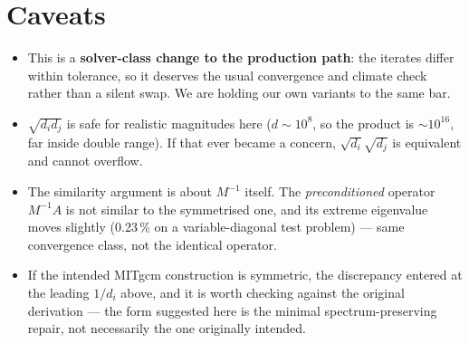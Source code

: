 \documentclass[11pt,a4paper]{article}
\newcommand{\Mi}{M^{-1}}
\begin{document}
\section{Caveats}

\begin{itemize}
  \item This is a \textbf{solver-class change to the production path}: the iterates differ
        within tolerance, so it deserves the usual convergence and climate check rather than a
        silent swap. We are holding our own variants to the same bar.
  \item $\sqrt{d_i d_j}$ is safe for realistic magnitudes here ($d\sim10^8$, so the product is
        $\sim10^{16}$, far inside double range). If that ever became a concern,
        $\sqrt{d_i}\sqrt{d_j}$ is equivalent and cannot overflow.
  \item The similarity argument is about $\Mi$ itself. The \emph{preconditioned} operator
        $\Mi A$ is not similar to the symmetrised one, and its extreme eigenvalue moves
        slightly (0.23\,\% on a variable-diagonal test problem) --- same convergence class, not
        the identical operator.
  \item If the intended MITgcm construction is symmetric, the discrepancy entered at the
        leading $1/d_i$ above, and it is worth checking against the original derivation ---
        the form suggested here is the minimal spectrum-preserving repair, not necessarily the
        one originally intended.
\end{itemize}
\end{document}
